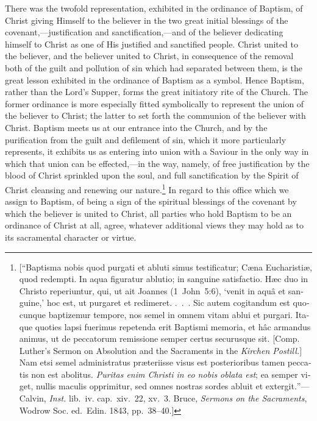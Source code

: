 \documentclass[
]{book}
\begin{document}
There was the twofold representation, exhibited in the ordinance of Baptism, of Christ giving Himself to the believer in the two great initial blessings of the covenant,---justification and sanctification,---and of the believer dedicating himself to Christ as one of His justified and sanctified people. Christ united to the believer, and the believer united to Christ, in consequence of the removal both of the guilt and pollution of sin which had separated between them, is the great lesson exhibited in the ordinance of Baptism as a symbol. Hence Baptism, rather than the Lord's Supper, forms the great initiatory rite of the Church. The former ordinance is more especially fitted symbolically to represent the union of the believer to Christ; the latter to set forth the communion of the believer with Christ. Baptism meets us at our entrance into the Church, and by the purification from the guilt and defilement of sin, which it more particularly represents, it exhibits us as entering into union with a Saviour in the only way in which that union can be effected,---in the way, namely, of free justification by the blood of Christ sprinkled upon the soul, and full sanctification by the Spirit of Christ cleansing and renewing our nature.\footnote{{[}``\foreignlanguage{latin}{Baptisma nobis quod purgati et abluti simus testificatur; Cæna Eucharistiæ, quod redempti. In aqua figuratur ablutio; in sanguine satisfactio. Hæc duo in Christo reperiuntur, qui, ut ait Joannes (1~John~5:6), `venit in aquâ et sanguine,' hoc est, ut purgaret et redimeret. .~.~. Sic autem cogitandum est quocunque baptizemur tempore, nos semel in omnem vitam ablui et purgari. Itaque quoties lapsi fuerimus repetenda erit Baptismi memoria, et hâc armandus animus, ut de peccatorum remissione semper certus securusque sit.} {[}Comp. Luther's Sermon on Absolution and the Sacraments in the \foreignlanguage{ngerman}{\emph{Kirchen Postill.}}{]} \foreignlanguage{latin}{Nam etsi semel administratus præteriisse visus est posterioribus tamen peccatis non est abolitus. \emph{Puritas enim Christi in eo nobis oblata est}; ea semper viget, nullis maculis opprimitur, sed omnes nostras sordes abluit et extergit.}''---Calvin, \emph{Inst.} lib.~iv. cap.~xiv.~22, xv.~3. Bruce, \emph{Sermons on the Sacraments}, Wodrow Soc. ed.~Edin. 1843, pp.~38--40.{]}} In regard to this office which we assign to Baptism, of being a sign of the spiritual blessings of the covenant by which the believer is united to Christ, all parties who hold Baptism to be an ordinance of Christ at all, agree, whatever additional views they may hold as to its sacramental character or virtue.
\end{document}
